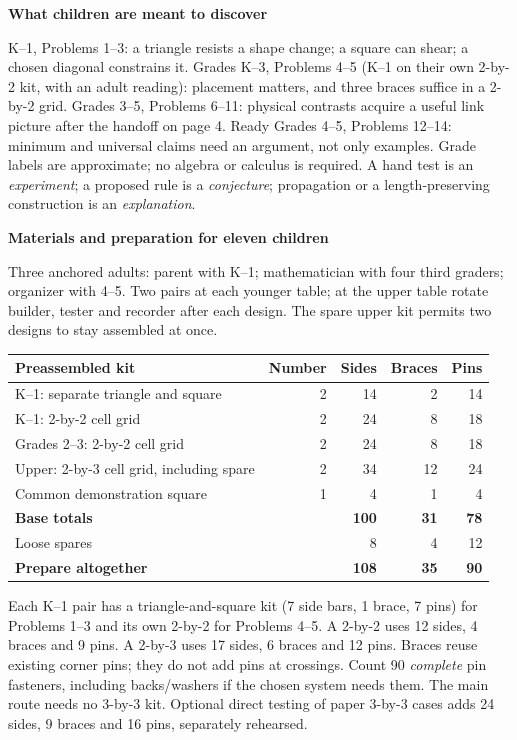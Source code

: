 \documentclass[letterpaper,11pt]{article}
\newcommand{\titleline}[1]{\par{\large\bfseries #1}\par}
\newcommand{\sub}[1]{\par\textbf{#1}\par}
\begin{document}
\sub{What children are meant to discover}
K--1, Problems 1--3: a triangle resists a shape change; a square can shear; a chosen diagonal constrains it. Grades K--3, Problems 4--5 (K--1 on their own 2-by-2 kit, with an adult reading): placement matters, and three braces suffice in a 2-by-2 grid. Grades 3--5, Problems 6--11: physical contrasts acquire a useful link picture after the handoff on page 4. Ready Grades 4--5, Problems 12--14: minimum and universal claims need an argument, not only examples. Grade labels are approximate; no algebra or calculus is required. A hand test is an \emph{experiment}; a proposed rule is a \emph{conjecture}; propagation or a length-preserving construction is an \emph{explanation}.

\newpage
\titleline{Materials and preparation for eleven children}
Three anchored adults: parent with K--1; mathematician with four third graders; organizer with 4--5. Two pairs at each younger table; at the upper table rotate builder, tester and recorder after each design. The spare upper kit permits two designs to stay assembled at once.

\begin{tabularx}{\linewidth}{@{}Xrrrr@{}}\textbf{Preassembled kit} &\textbf{Number}&\textbf{Sides}&\textbf{Braces}&\textbf{Pins}\\\hline
K--1: separate triangle and square &2&14&2&14\\
K--1: 2-by-2 cell grid &2&24&8&18\\
Grades 2--3: 2-by-2 cell grid &2&24&8&18\\
Upper: 2-by-3 cell grid, including spare &2&34&12&24\\
Common demonstration square &1&4&1&4\\\hline
\textbf{Base totals} &&\textbf{100}&\textbf{31}&\textbf{78}\\
Loose spares &&8&4&12\\
\textbf{Prepare altogether} &&\textbf{108}&\textbf{35}&\textbf{90}
\end{tabularx}

Each K--1 pair has a triangle-and-square kit (7 side bars, 1 brace, 7 pins) for Problems 1--3 and its own 2-by-2 for Problems 4--5. A 2-by-2 uses 12 sides, 4 braces and 9 pins. A 2-by-3 uses 17 sides, 6 braces and 12 pins. Braces reuse existing corner pins; they do not add pins at crossings. Count 90 \emph{complete} pin fasteners, including backs/washers if the chosen system needs them. The main route needs no 3-by-3 kit. Optional direct testing of paper 3-by-3 cases adds 24 sides, 9 braces and 16 pins, separately rehearsed.
\end{document}
